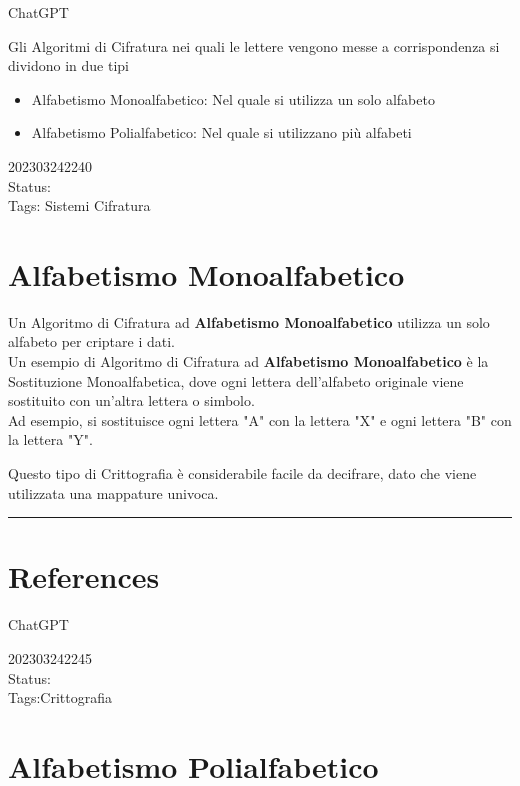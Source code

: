 \documentclass[
]{article}
\providecommand{\tightlist}{%
  \setlength{\itemsep}{0pt}\setlength{\parskip}{0pt}}
\begin{document}
ChatGPT

Gli Algoritmi di Cifratura nei quali le lettere vengono messe a
corrispondenza si dividono in due tipi

\begin{itemize}
\tightlist
\item
  Alfabetismo Monoalfabetico: Nel quale si utilizza un solo alfabeto
\item
  Alfabetismo Polialfabetico: Nel quale si utilizzano più alfabeti
\end{itemize}

202303242240\\
Status:\\
Tags: Sistemi Cifratura

\hypertarget{alfabetismo-monoalfabetico}{%
\section{Alfabetismo Monoalfabetico}\label{alfabetismo-monoalfabetico}}

Un Algoritmo di Cifratura ad \textbf{Alfabetismo Monoalfabetico}
utilizza un solo alfabeto per criptare i dati.\\
Un esempio di Algoritmo di Cifratura ad \textbf{Alfabetismo
Monoalfabetico} è la Sostituzione Monoalfabetica, dove ogni lettera
dell'alfabeto originale viene sostituito con un'altra lettera o
simbolo.\\
Ad esempio, si sostituisce ogni lettera "A" con la lettera "X" e ogni
lettera "B" con la lettera "Y".

Questo tipo di Crittografia è considerabile facile da decifrare, dato
che viene utilizzata una mappature univoca.

\begin{center}\rule{0.5\linewidth}{0.5pt}\end{center}

\hypertarget{references-3}{%
\section{References}\label{references-3}}

ChatGPT

\hfill\break

202303242245\\
Status:\\
Tags:Crittografia

\hypertarget{alfabetismo-polialfabetico}{%
\section{Alfabetismo Polialfabetico}\label{alfabetismo-polialfabetico}}
\end{document}
